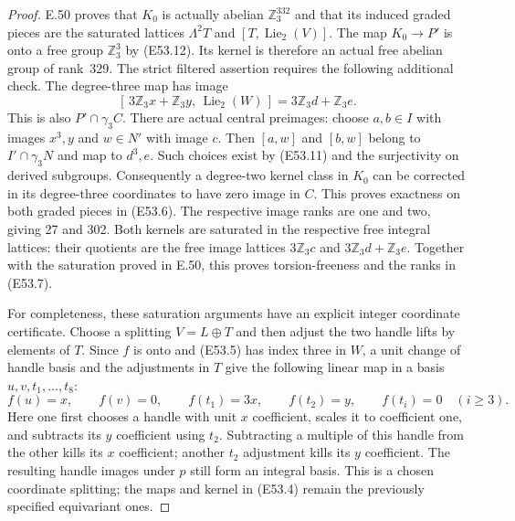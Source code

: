 \begin{proof}
E.50 proves that $K_0$ is actually abelian
$\mathbb Z_3^{332}$ and that its induced
graded pieces are the saturated lattices
$\Lambda^2T$ and $[T,\operatorname{Lie}_2(V)]$.
The map $K_0\to P'$ is onto a free group
$\mathbb Z_3^3$ by (E53.12). Its kernel is
therefore an actual free abelian group of
rank~329. The strict filtered assertion
requires the following additional check.
The degree-three map has image
\[
 [\,3\mathbb Z_3x+\mathbb Z_3y,\,
                        \operatorname{Lie}_2(W)\,]
           =3\mathbb Z_3d+\mathbb Z_3e .
 \tag{E53.13}
\]
This is also $P'\cap\gamma_3C$.
There are actual central preimages:
choose $a,b\in I$ with images $x^3,y$ and
$w\in N'$ with image $c$.
Then $[a,w]$ and $[b,w]$ belong to
$I'\cap\gamma_3N$ and map to $d^3,e$.
Such choices exist by (E53.11) and the
surjectivity on derived subgroups.
Consequently a degree-two kernel class
in $K_0$ can be corrected in its degree-three
coordinates to have zero image in $C$.
This proves exactness on both graded pieces
in (E53.6). The respective image ranks are
one and two, giving 27 and 302.
Both kernels are saturated in the respective
free integral lattices: their quotients
are the free image lattices $3\mathbb Z_3c$
and $3\mathbb Z_3d+\mathbb Z_3e$.
Together with the saturation proved in
E.50, this proves torsion-freeness and
the ranks in (E53.7).

For completeness, these saturation arguments
have an explicit integer coordinate certificate.
Choose a splitting $V=L\oplus T$ and then
adjust the two handle lifts by elements of
$T$. Since $f$ is onto and (E53.5) has
index three in $W$, a unit change of
handle basis and the adjustments in $T$
give the following linear map in a
basis $u,v,t_1,\ldots,t_8$:
\[
 f(u)=x,\qquad f(v)=0,\qquad
 f(t_1)=3x,\qquad f(t_2)=y,\qquad
 f(t_i)=0\quad(i\ge3).
 \tag{E53.14}
\]
Here one first chooses a handle with unit
$x$ coefficient, scales it to coefficient
one, and subtracts its $y$ coefficient
using $t_2$. Subtracting a multiple of
this handle from the other kills its
$x$ coefficient; another $t_2$ adjustment
kills its $y$ coefficient.
The resulting handle images under $p$
still form an integral basis.
This is a chosen coordinate splitting;
the maps and kernel in (E53.4) remain
the previously specified equivariant ones.


\end{proof}
